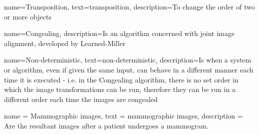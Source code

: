 
\makeglossaries

\renewcommand*{\glstextformat}[1]{\textbf{#1}}

{
    name=Transposition,
    text=transposition,
    description={To change the order of two or more objects}
}






{
    name=Congealing,
    description={Is an algorithm concerned with joint image alignment, developed by Learned-Miller \cite{joint-alignment}}
}






{
    name=Non-deterministic,
    text=non-deterministic,
    description={Is when a system or algorithm, even if given the same input, can behave in a different manner each time it is executed - i.e. in the Congealing algorithm, there is no set order in which the image transformations can be run, therefore they can be run in a different order each time the images are congealed}
}






{
  name = {Mammographic images},
  text = {mammographic images},
  description = {Are the resultant images after a patient undergoes a mammogram.}
}

